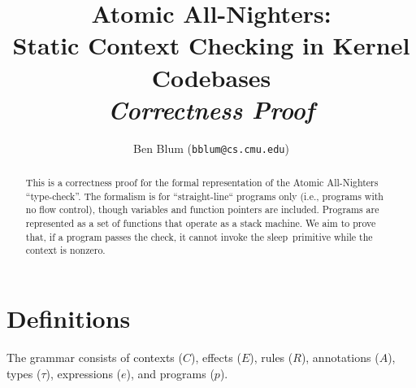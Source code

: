 \documentclass{article}
\begin{document}
\captionsetup{width=.75\textwidth,font=small,labelfont=bf}
\title{{\bf Atomic All-Nighters: \\ Static Context Checking in Kernel Codebases} \\ {\em Correctness Proof}}
\author{Ben Blum (\texttt{bblum@cs.cmu.edu})}
\maketitle

\newcommand\true{\;\textit{true}}
\newcommand\false{\;\textit{false}}

\newcommand\alpher\alpha
\newcommand\beter\beta
\newcommand\gammer\gamma
\newcommand\delter\delta
\newcommand\zeter\zeta
\newcommand\Sigmer\Sigma

\newcommand\NN{\mathbb{N}}
\newcommand\QQ{\mathbb{Q}}
\newcommand\RR{\mathbb{R}}
\newcommand\ZZ{\mathbb{Z}}

\newcommand\Infinity{ {\sf Infinity}}
\newcommand{\Nested}[1]{ {\sf Nested}~ #1}
\newcommand{\IncDec}[1]{ {\sf IncDec}~ #1}
\newcommand\Enable{ {\sf Enable}}
\newcommand\Disable{ {\sf Disable}}
\newcommand\inc{ {\sf inc}}
\newcommand\dec{ {\sf dec}}

\newcommand\sleep{{\sf sleep}}
\newcommand\unit{{1}}

\begin{abstract}
This is a correctness proof for the formal representation of the Atomic All-Nighters ``type-check''.
The formalism is for ``straight-line`` programs only (i.e., programs with no flow control), though variables and function pointers are included. Programs are represented as a set of functions that operate as a stack machine.
We aim to prove that, if a program passes the check, it cannot invoke the \sleep~primitive while the context is nonzero.
\end{abstract}


\section{Definitions}

The grammar consists of contexts ($C$), effects ($E$), rules ($R$), annotations ($A$), types ($\tau$), expressions ($e$), and programs ($p$).

\newcommand\expr{\ensuremath{\mathsf{e}}}
\newcommand\stmt{\ensuremath{\mathsf{st}}}
\newcommand\decl{\ensuremath{\mathsf{decl}}}
\newcommand\fn{\ensuremath{\mathsf{fn}}}
\newcommand\lv{\ensuremath{\mathsf{lv}}}
\newcommand\prog{\ensuremath{\mathcal{P}}}
\newcommand\fnname{\ensuremath{f}}
\newcommand\varname{\ensuremath{x}}
\newcommand\addr{\ensuremath{\&}}
\newcommand\rep[1]{\ensuremath{\overline{#1}}}
\newcommand\return{\ensuremath{\mathsf{return}}}
\end{document}
